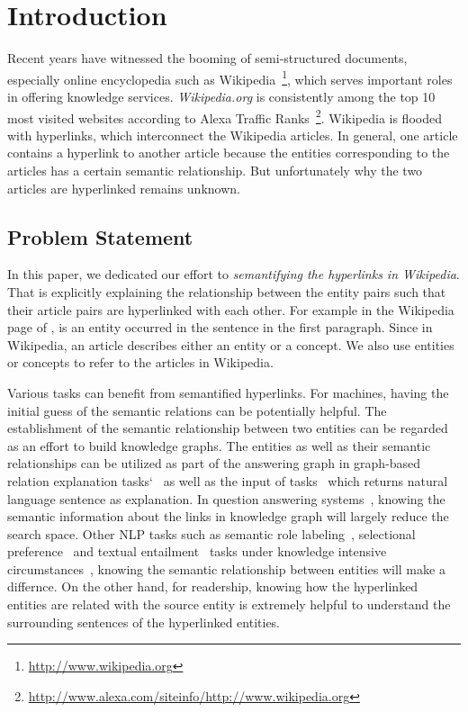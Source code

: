 \section{Introduction}
Recent years have witnessed the booming of semi-structured documents, especially online encyclopedia such as  Wikipedia~\footnote{\small\url{http://www.wikipedia.org}}, which serves important roles in offering knowledge services.
{\it Wikipedia.org} is consistently among the top 10 most visited websites according to Alexa Traffic Ranks~\footnote{\small\url{http://www.alexa.com/siteinfo/http://www.wikipedia.org}}.
Wikipedia is flooded with hyperlinks, which interconnect the Wikipedia articles.
In general, one article contains a hyperlink to another article because the entities corresponding to the articles has a certain semantic relationship.
But unfortunately why the two articles are hyperlinked remains unknown.


\subsection{Problem Statement}
In this paper, we dedicated our effort to {\it semantifying the hyperlinks in Wikipedia}.
That is explicitly explaining the relationship between the entity pairs such that their article pairs are hyperlinked with each other.
For example in the Wikipedia page of ,  is an entity occurred in the sentence  in the first paragraph.
Since in Wikipedia, an article describes either an entity or a concept. We also use entities or concepts to refer to the articles in Wikipedia.

Various tasks can benefit from semantified hyperlinks.
For machines, having the initial guess of the semantic relations can be potentially helpful.
The establishment of the semantic relationship between two entities can be regarded as an effort to build knowledge graphs.
The entities as well as their semantic relationships can be utilized as part of the answering graph in graph-based relation explanation tasks`~\cite{fang2011rex} as well as the input of tasks~\cite{voskarideslearning} which returns natural language sentence as explanation.
In question answering systems~\cite{yang2014slq}, knowing the semantic information about the links in knowledge graph will largely reduce the search space.
Other NLP tasks such as semantic role labeling~\cite{palmer2010semantic}, selectional preference~\cite{pantel2007isp} and textual entailment~\cite{androutsopoulos2010survey} tasks under knowledge intensive circumstances~\cite{yao2012unsupervised,exner2011using}, knowing the semantic relationship between entities will make a differnce.
On the other hand, for readership, knowing how the hyperlinked entities are related with the source entity is extremely helpful to understand the surrounding sentences of the hyperlinked entities.

